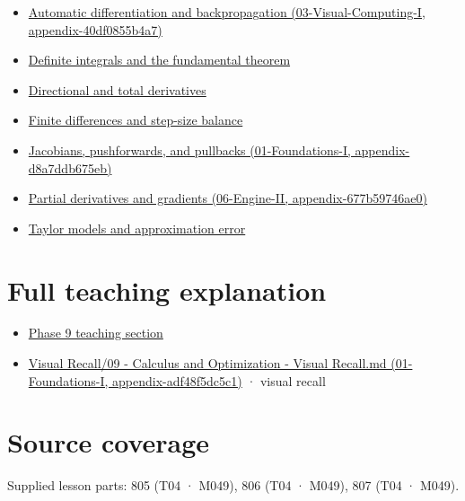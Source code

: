 \begin{itemize}
\tightlist
\item
  \href{../03-Visual-Computing-I/main.pdf\#nameddest=appendix-40df0855b4a7}{Automatic differentiation and backpropagation (03-Visual-Computing-I, appendix-40df0855b4a7)}
\item
  \hyperref[appendix-1a50e72435c2]{Definite integrals and the fundamental theorem}
\item
  \hyperref[appendix-e2d476574aab]{Directional and total derivatives}
\item
  \hyperref[appendix-e2d7b4f2161d]{Finite differences and step-size balance}
\item
  \href{../01-Foundations-I/main.pdf\#nameddest=appendix-d8a7ddb675eb}{Jacobians, pushforwards, and pullbacks (01-Foundations-I, appendix-d8a7ddb675eb)}
\item
  \href{../06-Engine-II/main.pdf\#nameddest=appendix-677b59746ae0}{Partial derivatives and gradients (06-Engine-II, appendix-677b59746ae0)}
\item
  \hyperref[appendix-32f39e9a3738]{Taylor models and approximation error}
\end{itemize}

\section{Full teaching explanation}\label{appendix-7bc181935c42-full-teaching-explanation}

\begin{itemize}
\tightlist
\item
  \href{Continuous\%20Notes/Computing\%20Foundations\%20-\%20From\%20Bits\%20to\%20C++\%20and\%20Systems\%20APIs\#Functions,\%20limits,\%20continuity,\%20and\%20scalar\%20change}{Phase 9 teaching section}
\item
  \href{../01-Foundations-I/main.pdf\#nameddest=appendix-adf48f5dc5c1}{Visual Recall/09 - Calculus and Optimization - Visual Recall.md (01-Foundations-I, appendix-adf48f5dc5c1)} · visual recall
\end{itemize}

\section{Source coverage}\label{appendix-7bc181935c42-source-coverage}

Supplied lesson parts: 805 (T04 · M049), 806 (T04 · M049), 807 (T04 · M049).
